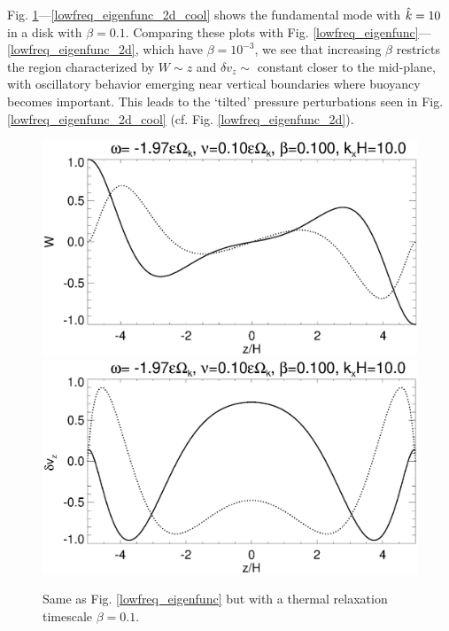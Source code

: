 Fig. \ref{lowfreq_eigenfunc_cool}---\ref{lowfreq_eigenfunc_2d_cool}
shows the fundamental mode with $\hat{k}=10$ in a disk with 
$\beta=0.1$. Comparing these plots with
Fig. \ref{lowfreq_eigenfunc}---\ref{lowfreq_eigenfunc_2d}, which have
$\beta=10^{-3}$, we see that increasing $\beta$ restricts the region 
characterized by $W\sim z$ and $\delta v_z\sim$ constant closer to the
mid-plane, with oscillatory behavior emerging near vertical boundaries
where buoyancy becomes important. This leads to the `tilted' pressure
perturbations seen in Fig. \ref{lowfreq_eigenfunc_2d_cool} 
(cf. Fig. \ref{lowfreq_eigenfunc_2d}). 

\begin{figure}
  \includegraphics[width=\linewidth,clip=true,trim=0cm 1.75cm 0cm
  0cm]{figures/eigenvectorW_beta0d1} 
  \includegraphics[width=\linewidth,clip=true,trim=0cm 0cm 0cm
  1cm]{figures/eigenvectorvz_beta0d1}
  \caption{Same as Fig. \ref{lowfreq_eigenfunc} but with a
    thermal relaxation timescale $\beta=0.1$. 
    \label{lowfreq_eigenfunc_cool}
  }
\end{figure}

